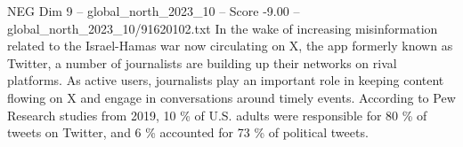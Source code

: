 \begin{textsample}{NEG Dim 9 – global\_north\_2023\_10 – Score -9.00 – global\_north\_2023\_10/91620102.txt}
In the wake of increasing misinformation related to the Israel-Hamas war now circulating on X, the app formerly known as Twitter, a number of journalists are building up their networks on rival platforms.
As active users, journalists play an important role in keeping content flowing on X and engage in conversations around timely events.
According to Pew Research studies from 2019, 10 \% of U.S. adults were responsible for 80 \% of tweets on Twitter, and 6 \% accounted for 73 \% of political tweets.

\end{textsample}

